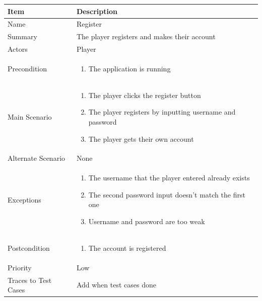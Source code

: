 \documentclass[12pt]{article}
\begin{document}
\begin{center}
\setlength{\tabcolsep}{18pt}
\renewcommand{\arraystretch}{1.3}
\begin{tabular}{ |p{3.4cm}|p{10cm}| }
    \hline
    
\textbf{Item} & \textbf{Description} \\
    \hline
    Name & Register\\
    \hline
    Summary & The player registers and makes their account \\
    \hline
    Actors & Player \\
    \hline
    Precondition & 
    \vspace*{-0.1in}
    \begin{enumerate}[leftmargin=0.2in]
        \item The application is running
    \end{enumerate}  \\
    \hline
    Main Scenario &     
    \vspace*{-0.1in}
    \begin{enumerate}[leftmargin=0.2in]
        \item The player clicks the register button
        \item The player registers by inputting username and password
        \item The player gets their own account
    \end{enumerate} \\
    \hline
    Alternate Scenario & None \\
    \hline
    Exceptions & 
    \vspace*{-0.1in}
    \begin{enumerate}[leftmargin=0.2in]
        \item The username that the player entered already exists
        \item The second password input doesn't match the first one
        \item Username and password are too weak
    \end{enumerate}  \\
    \hline
    Postcondition &
    \vspace*{-0.1in}
    \begin{enumerate}[leftmargin=0.2in]
        \item The account is registered
    \end{enumerate}  \\
    \hline
    Priority & Low \\
    \hline
    \small{Traces to Test Cases} & Add when test cases done  \\
    \hline
\end{tabular}
\end{center}
\end{document}
